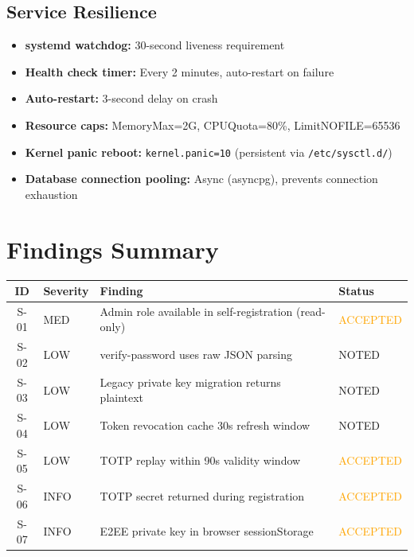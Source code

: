 \documentclass[11pt,a4paper]{article}
\begin{document}
\subsection{Service Resilience}
\begin{itemize}[nosep]
  \item \textbf{systemd watchdog:} 30-second liveness requirement
  \item \textbf{Health check timer:} Every 2 minutes, auto-restart on failure
  \item \textbf{Auto-restart:} 3-second delay on crash
  \item \textbf{Resource caps:} MemoryMax=2G, CPUQuota=80\%, LimitNOFILE=65536
  \item \textbf{Kernel panic reboot:} \texttt{kernel.panic=10} (persistent via \texttt{/etc/sysctl.d/})
  \item \textbf{Database connection pooling:} Async (asyncpg), prevents connection exhaustion
\end{itemize}

\newpage
\section{Findings Summary}

\begin{longtable}{clp{7.5cm}l}
\toprule
\textbf{ID} & \textbf{Severity} & \textbf{Finding} & \textbf{Status} \\
\midrule
\endhead
S-01 & \textcolor{medium}{MED} & Admin role available in self-registration (read-only) & \textcolor{orange}{ACCEPTED} \\
S-02 & \textcolor{low}{LOW} & verify-password uses raw JSON parsing & \textcolor{info}{NOTED} \\
S-03 & \textcolor{low}{LOW} & Legacy private key migration returns plaintext & \textcolor{info}{NOTED} \\
S-04 & \textcolor{low}{LOW} & Token revocation cache 30s refresh window & \textcolor{info}{NOTED} \\
S-05 & \textcolor{low}{LOW} & TOTP replay within 90s validity window & \textcolor{orange}{ACCEPTED} \\
S-06 & \textcolor{info}{INFO} & TOTP secret returned during registration & \textcolor{orange}{ACCEPTED} \\
S-07 & \textcolor{info}{INFO} & E2EE private key in browser sessionStorage & \textcolor{orange}{ACCEPTED} \\
\bottomrule
\end{longtable}
\end{document}
